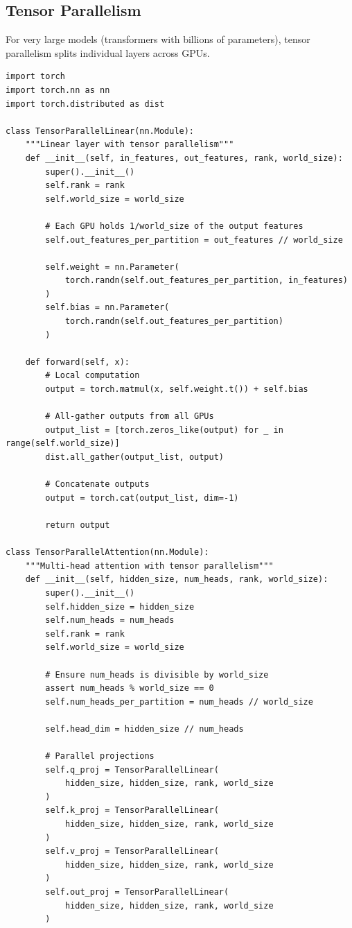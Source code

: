 \subsection{Tensor Parallelism}

For very large models (transformers with billions of parameters), tensor parallelism splits individual layers across GPUs.

\begin{lstlisting}[style=python, caption=Tensor parallelism for transformer layers]
import torch
import torch.nn as nn
import torch.distributed as dist

class TensorParallelLinear(nn.Module):
    """Linear layer with tensor parallelism"""
    def __init__(self, in_features, out_features, rank, world_size):
        super().__init__()
        self.rank = rank
        self.world_size = world_size

        # Each GPU holds 1/world_size of the output features
        self.out_features_per_partition = out_features // world_size

        self.weight = nn.Parameter(
            torch.randn(self.out_features_per_partition, in_features)
        )
        self.bias = nn.Parameter(
            torch.randn(self.out_features_per_partition)
        )

    def forward(self, x):
        # Local computation
        output = torch.matmul(x, self.weight.t()) + self.bias

        # All-gather outputs from all GPUs
        output_list = [torch.zeros_like(output) for _ in range(self.world_size)]
        dist.all_gather(output_list, output)

        # Concatenate outputs
        output = torch.cat(output_list, dim=-1)

        return output

class TensorParallelAttention(nn.Module):
    """Multi-head attention with tensor parallelism"""
    def __init__(self, hidden_size, num_heads, rank, world_size):
        super().__init__()
        self.hidden_size = hidden_size
        self.num_heads = num_heads
        self.rank = rank
        self.world_size = world_size

        # Ensure num_heads is divisible by world_size
        assert num_heads % world_size == 0
        self.num_heads_per_partition = num_heads // world_size

        self.head_dim = hidden_size // num_heads

        # Parallel projections
        self.q_proj = TensorParallelLinear(
            hidden_size, hidden_size, rank, world_size
        )
        self.k_proj = TensorParallelLinear(
            hidden_size, hidden_size, rank, world_size
        )
        self.v_proj = TensorParallelLinear(
            hidden_size, hidden_size, rank, world_size
        )
        self.out_proj = TensorParallelLinear(
            hidden_size, hidden_size, rank, world_size
        )


\end{lstlisting}
